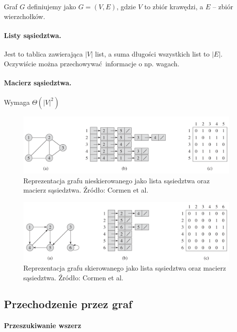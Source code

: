 \documentclass[10pt, oneside]{article}
\theoremstyle{remark}
\begin{document}
Graf $G$ definiujemy jako $G=(V, E)$, gdzie $V$ to zbiór krawędzi, a $E$ -- zbiór wierzchołków.
\paragraph{Listy sąsiedztwa.} 
Jest to tablica zawierająca $|V|$ list, a suma długości wszystkich list to $|E|$.
Oczywiście można przechowywać informacje o np. wagach.

\paragraph{Macierz sąsiedztwa.} 
Wymaga $\Theta(|V|^2)$

\begin{figure}[htpb]
	\centering
	\includegraphics[width=.9\textwidth]{figures/graphs}
	\caption{Reprezentacja grafu nieskierowanego jako lista sąsiedztwa oraz macierz sąsiedztwa. Źródło: Cormen et al.}
\end{figure}

\begin{figure}[htpb]
	\centering
	\includegraphics[width=.9\textwidth]{figures/graphs_directed}
	\caption{Reprezentacja grafu skierowanego jako lista sąsiedztwa oraz macierz sąsiedztwa. Źródło: Cormen et al.}
\end{figure}


\subsection{Przechodzenie przez graf}

\paragraph{Przeszukiwanie wszerz}
\end{document}
